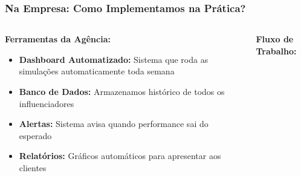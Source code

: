 \documentclass[aspectratio=169,12pt]{beamer}
\begin{document}
\begin{frame}
    \frametitle{Na Empresa: Como Implementamos na Prática?}
    
    \begin{columns}
        \begin{column}{0.6\textwidth}
            \textbf{\Large Ferramentas da Agência:}
            \vspace{0.5cm}
            
            \begin{itemize}
                \item[\faIcon{laptop}] \textcolor{azulprincipal}{\textbf{Dashboard Automatizado:}} Sistema que roda as simulações automaticamente toda semana
                \vspace{0.3cm}
                
                \item[\faIcon{database}] \textcolor{azulprincipal}{\textbf{Banco de Dados:}} Armazenamos histórico de todos os influenciadores
                \vspace{0.3cm}
                
                \item[\faIcon{bell}] \textcolor{azulprincipal}{\textbf{Alertas:}} Sistema avisa quando performance sai do esperado
                \vspace{0.3cm}
                
                \item[\faIcon{file-alt}] \textcolor{azulprincipal}{\textbf{Relatórios:}} Gráficos automáticos para apresentar aos clientes
            \end{itemize}
        \end{column}
        
        \begin{column}{0.4\textwidth}
            \begin{center}
                \textbf{\large Fluxo de Trabalho:}
                \vspace{0.3cm}
                
\end{center}
\end{column}
\end{columns}
\end{frame}
\end{document}
